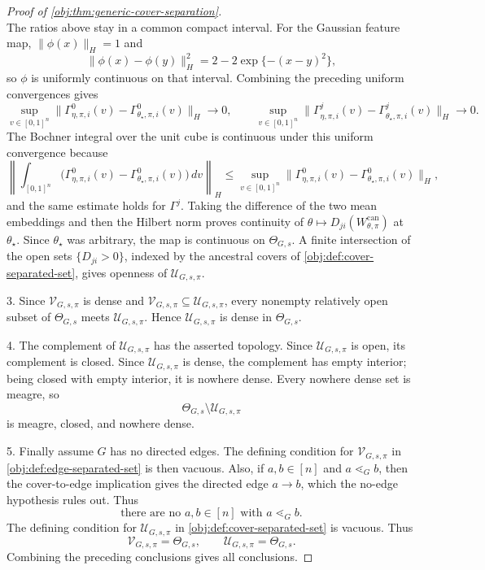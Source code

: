 \documentclass[11pt]{article}
\begin{document}
\begin{proof}[Proof of \cref{obj:thm:generic-cover-separation}]
\[\]
The ratios above stay in a common compact interval.  For the Gaussian feature
map, \(\|\phi(x)\|_H=1\) and
\[
\|\phi(x)-\phi(y)\|_H^2
=2-2\exp\{-(x-y)^2\},
\]
so \(\phi\) is uniformly continuous on that interval.  Combining the preceding
uniform convergences gives
\[
\sup_{v\in[0,1]^n}
\|\Gamma^0_{\eta,\pi,i}(v)-\Gamma^0_{\theta_\star,\pi,i}(v)\|_H
\longrightarrow0,
\qquad
\sup_{v\in[0,1]^n}
\|\Gamma^j_{\eta,\pi,i}(v)-\Gamma^j_{\theta_\star,\pi,i}(v)\|_H
\longrightarrow0.
\]
The Bochner integral over the unit cube is continuous under this uniform
convergence because
\[
\left\|
\int_{[0,1]^n}
\bigl(\Gamma^0_{\eta,\pi,i}(v)-\Gamma^0_{\theta_\star,\pi,i}(v)\bigr)\,dv
\right\|_H
\le
\sup_{v\in[0,1]^n}
\|\Gamma^0_{\eta,\pi,i}(v)-\Gamma^0_{\theta_\star,\pi,i}(v)\|_H,
\]
and the same estimate holds for \(\Gamma^j\).  Taking the difference of the two
mean embeddings and then the Hilbert norm proves continuity of
\(\theta\mapsto D_{ji}(W_{\theta,\pi}^{\mathrm{can}})\) at
\(\theta_\star\).  Since \(\theta_\star\) was arbitrary, the map is continuous
on \(\Theta_{G,s}\).  A finite intersection of the open sets \(\{D_{ji}>0\}\),
indexed by the ancestral covers of \cref{obj:def:cover-separated-set}, gives
openness of \(\mathcal U_{G,s,\pi}\). %

3.  Since \(\mathcal V_{G,s,\pi}\) is dense and
\(\mathcal V_{G,s,\pi}\subseteq\mathcal U_{G,s,\pi}\), every nonempty relatively
open subset of \(\Theta_{G,s}\) meets \(\mathcal U_{G,s,\pi}\).  Hence
\(\mathcal U_{G,s,\pi}\) is dense in \(\Theta_{G,s}\). %

4.  The complement of \(\mathcal U_{G,s,\pi}\) has the asserted topology.  Since
\(\mathcal U_{G,s,\pi}\) is open, its complement is closed.  Since
\(\mathcal U_{G,s,\pi}\) is dense, the complement has empty interior; being
closed with empty interior, it is nowhere dense.  Every nowhere dense set is
meagre, so
\[
\Theta_{G,s}\setminus\mathcal U_{G,s,\pi}
\]
is meagre, closed, and nowhere dense. %

5.  Finally assume \(G\) has no directed edges.  The defining condition for
\(\mathcal V_{G,s,\pi}\) in \cref{obj:def:edge-separated-set} is then
vacuous.  Also, if \(a,b\in[n]\) and \(a\lessdot_G b\), then the cover-to-edge implication
gives the directed edge \(a\to b\), which the no-edge hypothesis rules out.  Thus
\[
\text{there are no }a,b\in[n]\text{ with }a\lessdot_G b.
\]
The defining condition for
\(\mathcal U_{G,s,\pi}\) in \cref{obj:def:cover-separated-set} is vacuous.
Thus
\[
\mathcal V_{G,s,\pi}=\Theta_{G,s},
\qquad
\mathcal U_{G,s,\pi}=\Theta_{G,s}.
\]
Combining the preceding conclusions gives all conclusions. %
\end{proof}
\end{document}
